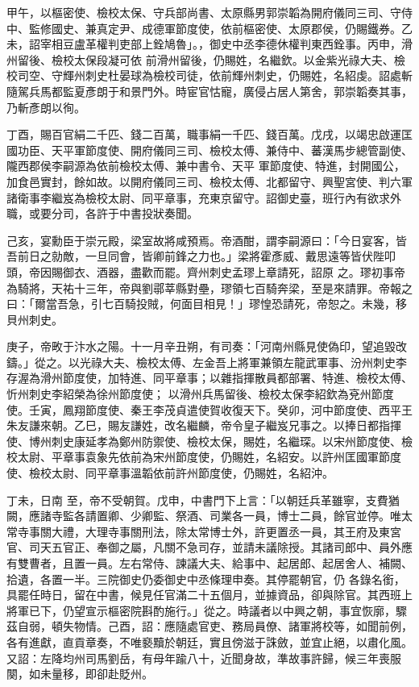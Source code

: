 \begin{pinyinscope}
 甲午，以樞密使、檢校太保、守兵部尚書、太原縣男郭崇韜為開府儀同三司、守侍中、監修國史、兼真定尹、成德軍節度使，依前樞密使、太原郡侯，仍賜鐵券。乙未，詔宰相豆盧革權判吏部上銓鳩魯」。，御史中丞李德休權判東西銓事。丙申，滑州留後、檢校太保段凝可依
 前滑州留後，仍賜姓，名繼欽。以金紫光祿大夫、檢校司空、守輝州刺史杜晏球為檢校司徒，依前輝州刺史，仍賜姓，名紹虔。詔處斬隨駕兵馬都監夏彥朗于和景門外。時宦官怙寵，廣侵占居人第舍，郭崇韜奏其事，乃斬彥朗以徇。



 丁酉，賜百官絹二千匹、錢二百萬，職事絹一千匹、錢百萬。戊戌，以竭忠啟運匡國功臣、天平軍節度使、開府儀同三司、檢校太傅、兼侍中、蕃漢馬步總管副使、隴西郡侯李嗣源為依前檢校太傅、兼中書令、天平
 軍節度使、特進，封開國公，加食邑實封，餘如故。以開府儀同三司、檢校太傅、北都留守、興聖宮使、判六軍諸衛事李繼岌為檢校太尉、同平章事，充東京留守。詔御史臺，班行內有欲求外職，或要分司，各許于中書投狀奏聞。



 己亥，宴勳臣于崇元殿，梁室故將咸預焉。帝酒酣，謂李嗣源曰：「今日宴客，皆吾前日之勍敵，一旦同會，皆卿前鋒之力也。」梁將霍彥威、戴思遠等皆伏陛叩頭，帝因賜御衣、酒器，盡歡而罷。齊州刺史孟璆上章請死，詔原
 之。璆初事帝為騎將，天祐十三年，帝與劉鄩莘縣對壘，璆領七百騎奔梁，至是來請罪。帝報之曰：「爾當吾急，引七百騎投賊，何面目相見！」璆惶恐請死，帝恕之。未幾，移貝州刺史。



 庚子，帝畋于汴水之陽。十一月辛丑朔，有司奏：「河南州縣見使偽印，望追毀改鑄。」從之。以光祿大夫、檢校太傅、左金吾上將軍兼領左龍武軍事、汾州刺史李存渥為滑州節度使，加特進、同平章事；以雜指揮散員都部署、特進、檢校太傅、忻州刺史李紹榮為徐州節度使；
 以滑州兵馬留後、檢校太保李紹欽為兗州節度使。壬寅，鳳翔節度使、秦王李茂貞遣使賀收復天下。癸卯，河中節度使、西平王朱友謙來朝。乙巳，賜友謙姓，改名繼麟，帝令皇子繼岌兄事之。以捧日都指揮使、博州刺史康延孝為鄭州防禦使、檢校太保，賜姓，名繼琛。以宋州節度使、檢校太尉、平章事袁象先依前為宋州節度使，仍賜姓，名紹安。以許州匡國軍節度使、檢校太尉、同平章事溫韜依前許州節度使，仍賜姓，名紹沖。



 丁未，日南
 至，帝不受朝賀。戊申，中書門下上言：「以朝廷兵革雖寧，支費猶闕，應諸寺監各請置卿、少卿監、祭酒、司業各一員，博士二員，餘官並停。唯太常寺事關大禮，大理寺事關刑法，除太常博士外，許更置丞一員，其王府及東宮官、司天五官正、奉御之屬，凡關不急司存，並請未議除授。其諸司郎中、員外應有雙曹者，且置一員。左右常侍、諫議大夫、給事中、起居郎、起居舍人、補闕、拾遺，各置一半。三院御史仍委御史中丞條理申奏。其停罷朝官，仍
 各錄名銜，具罷任時日，留在中書，候見任官滿二十五個月，並據資品，卻與除官。其西班上將軍已下，仍望宣示樞密院斟酌施行。」從之。時議者以中興之朝，事宜恢廓，驟茲自弱，頓失物情。己酉，詔：應隨處官吏、務局員僚、諸軍將校等，如聞前例，各有進獻，直貢章奏，不唯褻黷於朝廷，實且傍滋于誅斂，並宜止絕，以肅化風。又詔：左降均州司馬劉岳，有母年踰八十，近聞身故，準故事許歸，候三年喪服闋，如未量移，即卻赴貶州。




\end{pinyinscope}
